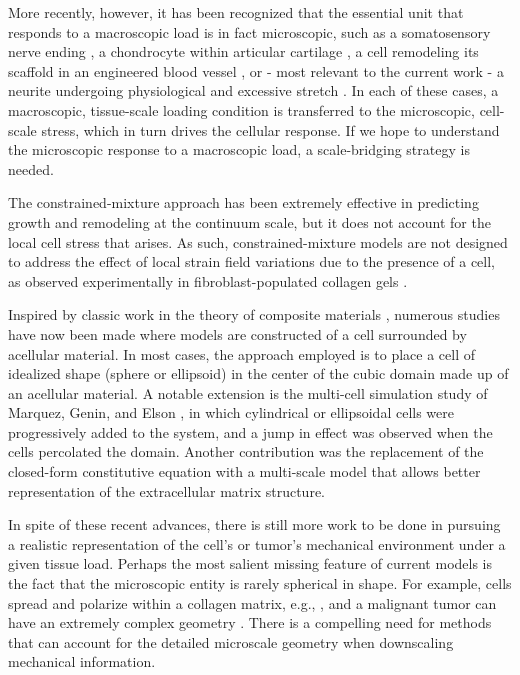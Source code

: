 \documentclass[]{interact}
\begin{document}
More recently, however, it has been recognized that the essential unit that responds to a macroscopic load is in fact microscopic, such as a somatosensory nerve ending \citep{Quindlen:2016ik}, a chondrocyte within articular cartilage \citep{Guilak:2000ir}, a cell remodeling its scaffold in an engineered blood vessel \citep{Syedain:2017br,Isenberg:2006cg}, or - most relevant to the current work - a neurite undergoing physiological and excessive stretch \citep{Zhang:2017gr,Sperry:2017ez}. In each of these cases, a macroscopic, tissue-scale loading condition is transferred to the microscopic, cell-scale stress, which in turn drives the cellular response. If we hope to understand the microscopic response to a macroscopic load, a scale-bridging strategy is needed.

The constrained-mixture approach \citep{Humphrey:2002ga} has been extremely effective in predicting growth and remodeling at the continuum scale, but it does not account for the local cell stress that arises. As such, constrained-mixture models are not designed to address the effect of local strain field variations due to the presence of a cell, as observed experimentally in fibroblast-populated collagen gels \citep{Pizzo:2005hv}. 

Inspired by classic work in the theory of composite materials \citep{Hashin:1962tm}, numerous studies have now been made where models are constructed of a cell surrounded by acellular material. In most cases, the approach employed is to place a cell of idealized shape (sphere or ellipsoid) in the center of the cubic domain made up of an acellular material. A notable extension is the multi-cell simulation study of Marquez, Genin, and Elson \citep{Marquez:2010dm}, in which cylindrical or ellipsoidal cells were progressively added to the system, and a jump in effect was observed when the cells percolated the domain.  Another contribution \citep{Lai:2013fp} was the replacement of the closed-form constitutive equation with a multi-scale model that allows better representation of the extracellular matrix structure.

In spite of these recent advances, there is still more work to be done in pursuing a realistic representation of the cell's or tumor's mechanical environment under a given tissue load. Perhaps the most salient missing feature of current models is the fact that the microscopic entity is rarely spherical in shape.  For example, cells spread and polarize within a collagen matrix, e.g., \citep{Guido:1993cm,Friedl:1998dl}, and a malignant tumor can have an extremely complex geometry \citep{Cristini:2003ja}. There is a compelling need for methods that can account for the detailed microscale geometry when downscaling mechanical information.
\end{document}
